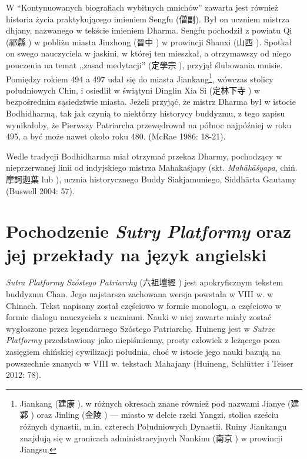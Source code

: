 W ``Kontynuowanych biografiach wybitnych mnichów'' zawarta jest również historia życia praktykującego imieniem Sengfu (僧副).
Był on uczniem mistrza dhjany, nazwanego w tekście imieniem Dharma. Sengfu pochodził z powiatu Qi (祁縣 ) w pobliżu miasta Jinzhong (晉中 ) w prowincji Shanxi (山西 ).
Spotkał on swego nauczyciela w jaskini, w której ten mieszkał, a otrzymawszy od niego pouczenia na temat ,,zasad medytacji'' (定學宗 ), przyjął ślubowania mnisie. Pomiędzy rokiem 494 a 497 udał się do miasta Jiankang\footnote{Jiankang (建康 ), w różnych okresach znane również pod nazwami Jianye (建鄴 ) oraz Jinling (金陵 ) --- miasto w delcie rzeki Yangzi, stolica sześciu różnych dynastii, m.in. czterech Południowych Dynastii. Ruiny Jiankangu znajdują się w granicach administracyjnych Nankinu (南京 ) w prowincji Jiangsu.}, wówczas stolicy południowych Chin, i osiedlił w świątyni Dinglin Xia Si (定林下寺 ) w bezpośrednim sąsiedztwie miasta.
Jeżeli przyjąć, że mistrz Dharma był w istocie Bodhidharmą, tak jak czynią to niektórzy historycy buddyzmu, z tego zapisu wynikałoby, że Pierwszy Patriarcha przewędrował na północ najpóźniej w roku 495, a być może nawet około roku 480.
(McRae 1986: 18-21).

Wedle tradycji Bodhidharma miał otrzymać przekaz Dharmy, pochodzący w nieprzerwanej linii od indyjskiego mistrza Mahakaśjapy (skt. \textit{Mahākāśyapa}, chiń. 摩訶迦葉  lub ), ucznia historycznego Buddy Siakjamuniego, Siddhārta Gautamy
(Buswell 2004: 57).

\section{Pochodzenie \textit{Sutry Platformy} oraz jej przekłady na język angielski}
\textit{Sutra Platformy Szóstego Patriarchy} (六祖壇經 ) jest apokryficznym tekstem buddyzmu Chan.
Jego najstarsza zachowana wersja powstała w VIII w. w Chinach. Tekst napisany został częściowo w formie monologu, a częściowo w formie dialogu nauczyciela z uczniami.
Nauki w niej zawarte miały zostać wygłoszone przez legendarnego Szóstego Patriarchę.
Huineng jest w \textit{Sutrze Platformy} przedstawiony jako niepiśmienny, prosty człowiek z leżącego poza zasięgiem chińskiej cywilizacji południa, choć w istocie jego nauki bazują na powszechnie znanych w VIII w. tekstach Mahajany
(Huineng, Schlütter i Teiser 2012: 78).


